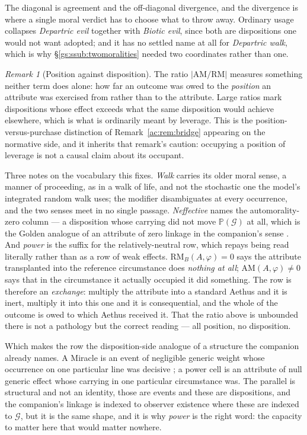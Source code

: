\documentclass[11pt]{article}
\numberwithin{equation}{section}
\theoremstyle{plain}
\theoremstyle{definition}
\theoremstyle{remark}
\newtheorem{remark}[theorem]{Remark}
\newcommand{\PP}{\mathbb{P}}
\begin{document}
\noindent The diagonal is agreement and the off-diagonal divergence, and
the divergence is where a single moral verdict has to choose what to
throw away. Ordinary usage collapses \emph{Departric evil} together with
\emph{Biotic evil}, since both are dispositions one would not want
adopted; and it has no settled name at all for \emph{Departric walk},
which is why \S\ref{gs:ssub:twomoralities} needed two coordinates rather
than one.

\begin{remark}[Position against disposition]\label{gs:rem:power}
The ratio $|\mathrm{AM}/\mathrm{RM}|$ measures something neither term
does alone: how far an outcome was owed to the \emph{position} an
attribute was exercised from rather than to the attribute. Large ratios
mark dispositions whose effect exceeds what the same disposition would
achieve elsewhere, which is what is ordinarily meant by leverage. This is
the position-versus-purchase distinction of
Remark~\ref{ac:rem:bridge} appearing on the normative side, and it
inherits that remark's caution: occupying a position of leverage is not a
causal claim about its occupant.

Three notes on the vocabulary this fixes. \emph{Walk} carries its older
moral sense, a manner of proceeding, as in a walk of life, and not
the stochastic one the model's integrated random walk uses; the modifier
disambiguates at every occurrence, and the two senses meet in no single
passage. \emph{Neffective} names the
automorality-zero column --- a disposition whose carrying did not move
$\PP(\mathcal G)$ at all, which is the Golden analogue of an attribute of
zero linkage in the companion's sense \cite{Nexus}. And \emph{power} is
the suffix for the relatively-neutral row, which repays being read
literally rather than as a row of weak effects. $\mathrm{RM}_B(A,\varphi)
=0$ says the attribute transplanted into the reference circumstance does
\emph{nothing at all}; $\mathrm{AM}(A,\varphi)\neq0$ says that in the
circumstance it actually occupied it did something. The row is therefore
an \emph{exchange}: multiply the attribute into a standard Aethus and it
is inert, multiply it into this one and it is consequential, and the
whole of the outcome is owed to which Aethus received it. That the ratio
above is unbounded there is not a pathology but the correct reading ---
all position, no disposition.

Which makes the row the disposition-side analogue of a structure the
companion already names. A Miracle is an event of negligible generic
weight whose occurrence on one particular line was decisive
\cite{Nexus}; a power cell is an attribute of null generic effect whose
carrying in one particular circumstance was. The parallel is structural
and not an identity, those are events and these are dispositions, and
the companion's linkage is indexed to observer existence where these are
indexed to $\mathcal G$, but it is the same shape, and it is why
\emph{power} is the right word: the capacity to matter here that would
matter nowhere.


\end{remark}
\end{document}
